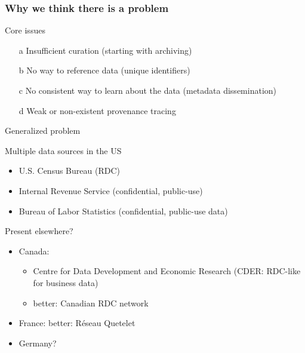 \begin{frame}
\frametitle{Why we think there is a problem}
\begin{block}{Core issues}
\begin{itemize}
\item[a] Insufficient curation (starting with archiving)
\item[b] No way to reference data (unique identifiers)
\item[c] No consistent way to learn about the data (metadata dissemination)
\item[d] Weak or non-existent provenance tracing
\end{itemize}
\end{block}
\end{frame}

\begin{frame}{Generalized problem}
\begin{block}{Multiple data sources in the US}
\begin{itemize}
\item U.S. Census Bureau (RDC) \hyperlink{Census}{}
\item Internal Revenue Service (confidential, public-use)\hyperlink{IRS}{}
\item Bureau of Labor Statistics (confidential, public-use data)\hyperlink{BLS}{}

\end{itemize}
\end{block}
\begin{block}{Present elsewhere?}
\begin{itemize}
\item Canada: 
\begin{itemize}
\item Centre for Data Development and Economic Research (CDER: RDC-like for business data)\hyperlink{CDER}{}
\item better: Canadian RDC network\hyperlink{CRDC}{}
\end{itemize}
\item France: better: R\'eseau Quetelet\hyperlink{France}{}
\item Germany?
\end{itemize}
\end{block}
\end{frame}


